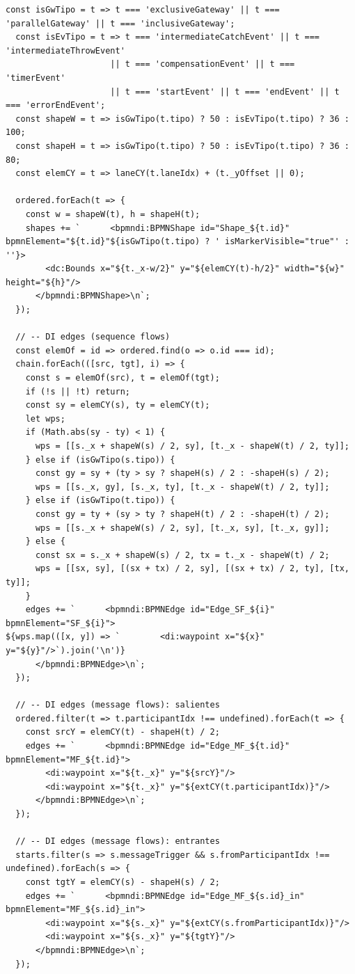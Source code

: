 \begin{lstlisting}[style=promptbox]
  const isGwTipo = t => t === 'exclusiveGateway' || t === 'parallelGateway' || t === 'inclusiveGateway';
  const isEvTipo = t => t === 'intermediateCatchEvent' || t === 'intermediateThrowEvent'
                     || t === 'compensationEvent' || t === 'timerEvent'
                     || t === 'startEvent' || t === 'endEvent' || t === 'errorEndEvent';
  const shapeW = t => isGwTipo(t.tipo) ? 50 : isEvTipo(t.tipo) ? 36 : 100;
  const shapeH = t => isGwTipo(t.tipo) ? 50 : isEvTipo(t.tipo) ? 36 : 80;
  const elemCY = t => laneCY(t.laneIdx) + (t._yOffset || 0);

  ordered.forEach(t => {
    const w = shapeW(t), h = shapeH(t);
    shapes += `      <bpmndi:BPMNShape id="Shape_${t.id}" bpmnElement="${t.id}"${isGwTipo(t.tipo) ? ' isMarkerVisible="true"' : ''}>
        <dc:Bounds x="${t._x-w/2}" y="${elemCY(t)-h/2}" width="${w}" height="${h}"/>
      </bpmndi:BPMNShape>\n`;
  });

  // -- DI edges (sequence flows)
  const elemOf = id => ordered.find(o => o.id === id);
  chain.forEach(([src, tgt], i) => {
    const s = elemOf(src), t = elemOf(tgt);
    if (!s || !t) return;
    const sy = elemCY(s), ty = elemCY(t);
    let wps;
    if (Math.abs(sy - ty) < 1) {
      wps = [[s._x + shapeW(s) / 2, sy], [t._x - shapeW(t) / 2, ty]];
    } else if (isGwTipo(s.tipo)) {
      const gy = sy + (ty > sy ? shapeH(s) / 2 : -shapeH(s) / 2);
      wps = [[s._x, gy], [s._x, ty], [t._x - shapeW(t) / 2, ty]];
    } else if (isGwTipo(t.tipo)) {
      const gy = ty + (sy > ty ? shapeH(t) / 2 : -shapeH(t) / 2);
      wps = [[s._x + shapeW(s) / 2, sy], [t._x, sy], [t._x, gy]];
    } else {
      const sx = s._x + shapeW(s) / 2, tx = t._x - shapeW(t) / 2;
      wps = [[sx, sy], [(sx + tx) / 2, sy], [(sx + tx) / 2, ty], [tx, ty]];
    }
    edges += `      <bpmndi:BPMNEdge id="Edge_SF_${i}" bpmnElement="SF_${i}">
${wps.map(([x, y]) => `        <di:waypoint x="${x}" y="${y}"/>`).join('\n')}
      </bpmndi:BPMNEdge>\n`;
  });

  // -- DI edges (message flows): salientes
  ordered.filter(t => t.participantIdx !== undefined).forEach(t => {
    const srcY = elemCY(t) - shapeH(t) / 2;
    edges += `      <bpmndi:BPMNEdge id="Edge_MF_${t.id}" bpmnElement="MF_${t.id}">
        <di:waypoint x="${t._x}" y="${srcY}"/>
        <di:waypoint x="${t._x}" y="${extCY(t.participantIdx)}"/>
      </bpmndi:BPMNEdge>\n`;
  });

  // -- DI edges (message flows): entrantes
  starts.filter(s => s.messageTrigger && s.fromParticipantIdx !== undefined).forEach(s => {
    const tgtY = elemCY(s) - shapeH(s) / 2;
    edges += `      <bpmndi:BPMNEdge id="Edge_MF_${s.id}_in" bpmnElement="MF_${s.id}_in">
        <di:waypoint x="${s._x}" y="${extCY(s.fromParticipantIdx)}"/>
        <di:waypoint x="${s._x}" y="${tgtY}"/>
      </bpmndi:BPMNEdge>\n`;
  });


\end{lstlisting}
